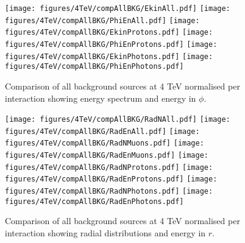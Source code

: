 \clearpage
\begin{figure}
\begin{center}
  \texttt{[image: figures/4TeV/compAllBKG/EkinAll.pdf]}
  \texttt{[image: figures/4TeV/compAllBKG/PhiEnAll.pdf]}
  \texttt{[image: figures/4TeV/compAllBKG/EkinProtons.pdf]}
  \texttt{[image: figures/4TeV/compAllBKG/PhiEnProtons.pdf]}
  \texttt{[image: figures/4TeV/compAllBKG/EkinPhotons.pdf]}
  \texttt{[image: figures/4TeV/compAllBKG/PhiEnPhotons.pdf]}
\end{center}
\vspace{-0.6cm}
 \caption{Comparison of all background sources at 4 TeV normalised per interaction showing energy spectrum and energy in $\phi$.
  \label{fig:compAllBKG_perInt1}}
\end{figure}

\begin{figure}
\begin{center}
  \texttt{[image: figures/4TeV/compAllBKG/RadNAll.pdf]}
  \texttt{[image: figures/4TeV/compAllBKG/RadEnAll.pdf]}
  \texttt{[image: figures/4TeV/compAllBKG/RadNMuons.pdf]}
  \texttt{[image: figures/4TeV/compAllBKG/RadEnMuons.pdf]}
  \texttt{[image: figures/4TeV/compAllBKG/RadNProtons.pdf]}
  \texttt{[image: figures/4TeV/compAllBKG/RadEnProtons.pdf]}
  \texttt{[image: figures/4TeV/compAllBKG/RadNPhotons.pdf]}
  \texttt{[image: figures/4TeV/compAllBKG/RadEnPhotons.pdf]}
\end{center}
\vspace{-0.6cm}
 \caption{Comparison of all background sources at 4 TeV normalised per interaction showing radial distributions and energy in $r$.
  \label{fig:compAllBKG_perInt2}}
\end{figure}

